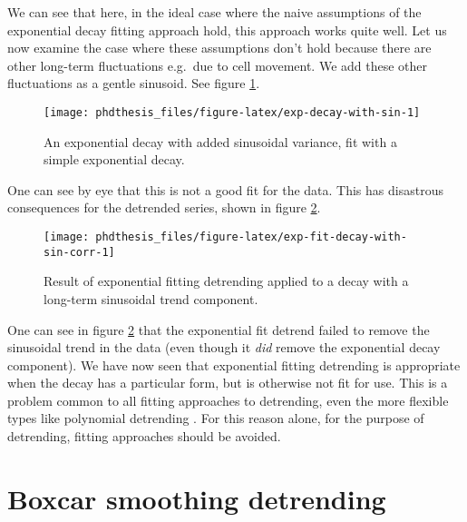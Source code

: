 \documentclass[12pt,]{book}
\theoremstyle{definition}
\theoremstyle{definition}
\theoremstyle{definition}
\theoremstyle{remark}
\begin{document}
We can see that here, in the ideal case where the naive assumptions of
the exponential decay fitting approach hold, this approach works quite
well. Let us now examine the case where these assumptions don't hold
because there are other long-term fluctuations e.g.~due to cell
movement. We add these other fluctuations as a gentle sinusoid. See
figure \ref{fig:exp-decay-with-sin}.




\begin{figure}

\texttt{[image: phdthesis\_files/figure-latex/exp-decay-with-sin-1]} \hfill{}

\caption{An exponential decay with added
sinusoidal variance, fit with a simple exponential decay.}\label{fig:exp-decay-with-sin}
\end{figure}

One can see by eye that this is not a good fit for the data. This has
disastrous consequences for the detrended series, shown in figure
\ref{fig:exp-fit-decay-with-sin-corr}.





\begin{figure}

\texttt{[image: phdthesis\_files/figure-latex/exp-fit-decay-with-sin-corr-1]} \hfill{}

\caption{Result of exponential fitting
detrending applied to a decay with a long-term sinusoidal trend
component.}\label{fig:exp-fit-decay-with-sin-corr}
\end{figure}

One can see in figure \ref{fig:exp-fit-decay-with-sin-corr} that the
exponential fit detrend failed to remove the sinusoidal trend in the
data (even though it \emph{did} remove the exponential decay component).
We have now seen that exponential fitting detrending is appropriate when
the decay has a particular form, but is otherwise not fit for use. This
is a problem common to all fitting approaches to detrending, even the
more flexible types like polynomial detrending \citep{polynomial}. For
this reason alone, for the purpose of detrending, fitting approaches
should be avoided.

\section{Boxcar smoothing detrending}\label{boxcar-smoothing-detrending}
\end{document}
